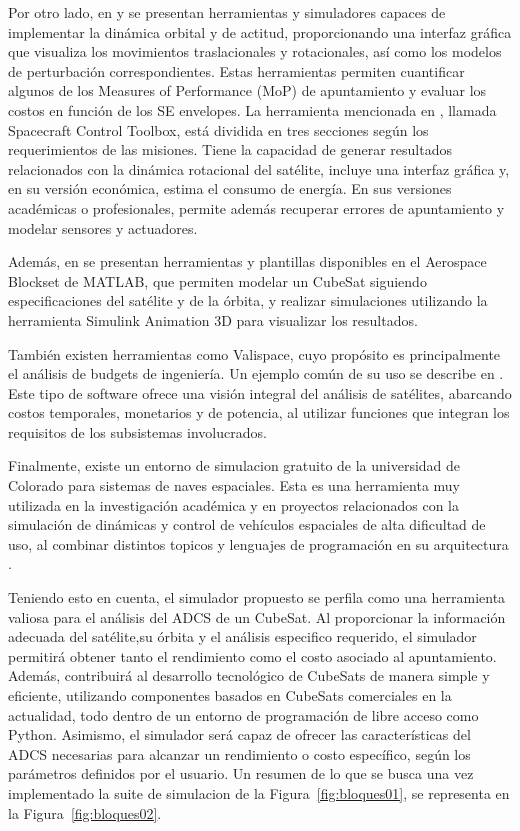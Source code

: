 Por otro lado, en \cite{ref18} y \cite{ref19} se presentan herramientas y simuladores capaces de implementar la dinámica orbital y de actitud, proporcionando una interfaz gráfica que visualiza los movimientos traslacionales y rotacionales, así como los modelos de perturbación correspondientes. Estas herramientas permiten cuantificar algunos de los Measures of Performance (MoP) de apuntamiento y evaluar los costos en función de los SE envelopes. La herramienta mencionada en \cite{ref18}, llamada Spacecraft Control Toolbox, está dividida en tres secciones según los requerimientos de las misiones. Tiene la capacidad de generar resultados relacionados con la dinámica rotacional del satélite, incluye una interfaz gráfica y, en su versión económica, estima el consumo de energía. En sus versiones académicas o profesionales, permite además recuperar errores de apuntamiento y modelar sensores y actuadores.

Además, en \cite{ref19} se presentan herramientas y plantillas disponibles en el Aerospace Blockset de MATLAB, que permiten modelar un CubeSat siguiendo especificaciones del satélite y de la órbita, y realizar simulaciones utilizando la herramienta Simulink Animation 3D para visualizar los resultados.

También existen herramientas como Valispace, cuyo propósito es principalmente el análisis de budgets de ingeniería. Un ejemplo común de su uso se describe en \cite{ref20}. Este tipo de software ofrece una visión integral del análisis de satélites, abarcando costos temporales, monetarios y de potencia, al utilizar funciones que integran los requisitos de los subsistemas involucrados.

Finalmente, existe un entorno de simulacion gratuito de la universidad de Colorado para sistemas de naves espaciales. Esta es una herramienta muy utilizada en la investigación académica y en proyectos relacionados con la simulación de dinámicas y control de vehículos espaciales de alta dificultad de uso, al combinar distintos topicos y lenguajes de programación en su arquitectura \cite{ref36}.

Teniendo esto en cuenta, el simulador propuesto se perfila como una herramienta valiosa para el análisis del \gls{ADCS} de un CubeSat. Al proporcionar la información adecuada del satélite,su órbita y el análisis especifico requerido, el simulador permitirá obtener tanto el rendimiento como el costo asociado al apuntamiento. Además, contribuirá al desarrollo tecnológico de CubeSats de manera simple y eficiente, utilizando componentes basados en CubeSats comerciales en la actualidad, todo dentro de un entorno de programación de libre acceso como Python. Asimismo, el simulador será capaz de ofrecer las características del \gls{ADCS} necesarias para alcanzar un rendimiento o costo específico, según los parámetros definidos por el usuario. Un resumen de lo que se busca una vez implementado la suite de simulacion de la Figura~\ref{fig:bloques01}, se representa en la Figura~\ref{fig:bloques02}.


